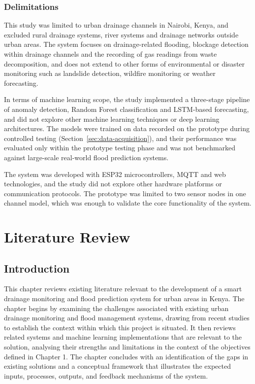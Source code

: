 \documentclass[12pt, a4paper]{article}
\begin{document}
\subsubsection{Delimitations}

This study was limited to urban drainage channels in Nairobi, Kenya, and excluded rural drainage systems, river systems and drainage networks outside urban areas. The system focuses on drainage-related flooding, blockage detection within drainage channels and the recording of gas readings from waste decomposition, and does not extend to other forms of environmental or disaster monitoring such as landslide detection, wildfire monitoring or weather forecasting.

In terms of machine learning scope, the study implemented a three-stage pipeline of anomaly detection, Random Forest classification and LSTM-based forecasting, and did not explore other machine learning techniques or deep learning architectures. The models were trained on data recorded on the prototype during controlled testing (Section~\ref{sec:data-acquisition}), and their performance was evaluated only within the prototype testing phase and was not benchmarked against large-scale real-world flood prediction systems.

The system was developed with ESP32 microcontrollers, MQTT and web technologies, and the study did not explore other hardware platforms or communication protocols. The prototype was limited to two sensor nodes in one channel model, which was enough to validate the core functionality of the system.


\clearpage
\section{Literature Review}
\subsection{Introduction}

This chapter reviews existing literature relevant to the development of a smart drainage monitoring and flood prediction system for urban areas in Kenya. The chapter begins by examining the challenges associated with existing urban drainage monitoring and flood management systems, drawing from recent studies to establish the context within which this project is situated. It then reviews related systems and machine learning implementations that are relevant to the solution, analysing their strengths and limitations in the context of the objectives defined in Chapter 1. The chapter concludes with an identification of the gaps in existing solutions and a conceptual framework that illustrates the expected inputs, processes, outputs, and feedback mechanisms of the system.
\end{document}
